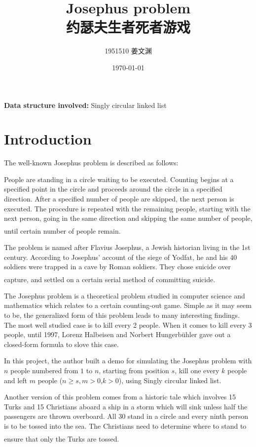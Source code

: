 \documentclass[cn,black,12pt,normal]{elegantnote}
\title{Josephus problem\\约瑟夫生者死者游戏}
\author{1951510\; 姜文渊}
\institute{\small \url{https://github.com/jwyjohn/Jwy_DataStructureHomework}}
\date{\today}
\newcommand{\uct}[1]{\textsuperscript{\textsuperscript{\cite{#1}}}}
\begin{document}
\maketitle

\textbf{Data structure involved:} Singly circular linked list


\tableofcontents

\newpage


\section{Introduction}

The well-known Josephus problem is described as follows:

People are standing in a circle waiting to be executed. Counting begins at a specified point in the circle and proceeds around the circle in a specified direction. After a specified number of people are skipped, the next person is executed. The procedure is repeated with the remaining people, starting with the next person, going in the same direction and skipping the same number of people, until certain number of people remain.\uct{wiki:Josephus_problem}

The problem is named after Flavius Josephus, a Jewish historian living in the 1st century. According to Josephus' account of the siege of Yodfat, he and his 40 soldiers were trapped in a cave by Roman soldiers. They chose suicide over capture, and settled on a certain serial method of committing suicide.\uct{wiki:Josephus_problem}

The Josephus problem is a theoretical problem studied in computer science and mathematics which relates to a certain counting-out game. Simple as it may seem to be, the generalized form of this problem leads to many interesting findings. The most well studied case is to kill every 2 people. When it comes to kill every 3 people, until 1997, Lorenz Halbeisen and Norbert Hungerbühler gave out a closed-form formula to slove this case.

In this project, the author built a demo for simulating the Josephus problem with $n$ people numbered from $1$ to $n$, starting from position $s$, kill one every $k$ people and left $m$ people ($n\geq s,m >0$,$k>0$), using Singly circular linked list.

Another version of this problem comes from a historic tale which involves 15 Turks and 15 Christians aboard a ship in a storm which will sink unless half the passengers are thrown overboard. All 30 stand in a circle and every ninth person is to be tossed into the sea. The Christians need to determine where to stand to ensure that only the Turks are tossed.\uct{newman1988world}
\end{document}
